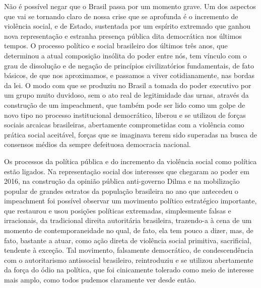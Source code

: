 Não é possível negar que o Brasil passa por um momento grave. Um dos
aspectos que vai se tornando claro de nossa crise que se aprofunda é o
incremento de violência social, e de Estado, sustentada por um espírito
extremado que ganhou nova representação e estranha presença pública dita
democrática nos últimos tempos. O processo político e social brasileiro
dos últimos três anos, que determinou a atual composição insólita do
poder entre nós, tem vínculo com o grau de dissolução e de negação de
princípios civilizatórios fundamentais, de fato básicos, de que nos
aproximamos, e passamos a viver cotidianamente, nas bordas da lei. O
modo com que se produziu no Brasil a tomada do poder executivo por um
grupo muito duvidoso, sem o ato real de legitimidade das urnas, através
da construção de um impeachment, que também pode ser lido como um golpe
de novo tipo no processo institucional democrático, liberou e se
utilizou de forças sociais arcaicas brasileiras, abertamente
comprometidas com a violência como prática social aceitável, forças que
se imaginava terem sido superadas na busca de consensos médios da sempre
defeituosa democracia nacional.

Os processos da política pública e do incremento da violência social
como política estão ligados. Na representação social dos interesses que
chegaram ao poder em 2016, na construção da opinião pública anti-governo
Dilma e na mobilização popular de grandes estratos da população
brasileira no ano que antecedeu o impeachment foi possível observar um
movimento político estratégico importante, que restaurou e usou posições
políticas extremadas, simplesmente falsas e irracionais, da tradicional
direita autoritária brasileira, trazendo-a à cena de um momento de
contemporaneidade no qual, de fato, ela tem pouco a dizer, mas, de fato,
bastante a atuar, como ação direta de violência social primitiva,
sacrificial, tendente à exceção. Tal movimento, falsamente democrático,
de condescendência com o autoritarismo antissocial brasileiro,
reintroduziu e se utilizou abertamente da força do ódio na política, que
foi cinicamente tolerado como meio de interesse mais amplo, como todos
pudemos claramente ver desde então.

